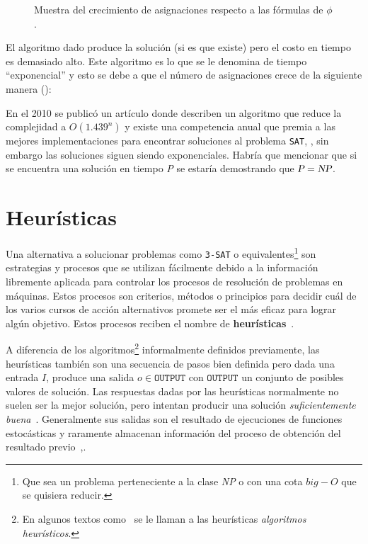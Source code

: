 \begin{figure}[h]

\caption[short caption]{Muestra del crecimiento de asignaciones respecto a las fórmulas de $\phi$.}
\label{fig:satfigure}
\end{figure} 


El algoritmo dado produce la solución (si es que existe) pero el costo en tiempo
es demasiado alto. Este algoritmo es lo que se le denomina de tiempo ``exponencial'' y
esto se debe a que el número de asignaciones crece de la siguiente manera ():



En el 2010 se publicó un artículo donde describen un algoritmo que reduce la
complejidad a $O(1.439^{n})$ y existe una competencia anual que premia a las
mejores implementaciones para encontrar soluciones al problema
\texttt{SAT},\cite{Kutzkov2010} \cite{satcompetition}, sin embargo las
soluciones siguen siendo exponenciales.  Habría que mencionar que si se
encuentra una solución en tiempo \textsl{P} se estaría demostrando que
$\textsl{P}=\textsl{NP}$.

\section{Heurísticas}

Una alternativa a solucionar problemas como \texttt{3-SAT} o
equivalentes\footnote{Que sea un problema perteneciente a la clase \textsl{NP} o
  con una cota \textit{$big-O$} que se quisiera reducir.} son estrategias y procesos
que se utilizan fácilmente debido a la información libremente aplicada para
controlar los procesos de resolución de problemas en máquinas. Estos procesos
son criterios, métodos o principios para decidir cuál de los varios cursos de
acción alternativos promete ser el más eficaz para lograr algún objetivo. Estos
procesos reciben el nombre de \textbf{heurísticas}~\cite{Pearl1984}.

A diferencia de los algoritmos\footnote{En algunos textos
  como~\cite{DeInformatica2010} se le llaman a las heurísticas
  \textit{algoritmos heurísticos}.} informalmente definidos previamente, las
heurísticas también son una secuencia de pasos bien definida pero dada una
entrada $I$, produce una salida $o \in \texttt{OUTPUT}$ con $\texttt{OUTPUT}$ un
conjunto de posibles valores de solución.  Las respuestas dadas por las
heurísticas normalmente no suelen ser la mejor solución, pero intentan producir
una solución \emph{suficientemente buena}~\cite{Gigerenzer2008}.  Generalmente
sus salidas son el resultado de ejecuciones de funciones estocásticas y
raramente almacenan información del proceso de obtención del resultado
previo~\cite{heuristicdefoxford},\cite{Pearl1984}.

